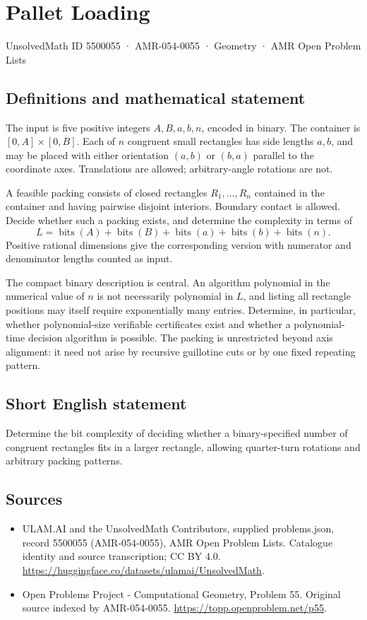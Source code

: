 \documentclass[11pt,a4paper]{article}
\begin{document}
\section*{Pallet Loading}\label{5500055}
{\small UnsolvedMath ID 5500055 · AMR-054-0055 · Geometry · AMR Open Problem Lists}
\subsection{Definitions and mathematical statement}
The input is five positive integers $A,B,a,b,n$, encoded in binary.
The container is $[0,A]\times[0,B]$. Each of $n$ congruent small
rectangles has side lengths $a,b$, and may be placed with either
orientation $(a,b)$ or $(b,a)$ parallel to the coordinate axes.
Translations are allowed; arbitrary-angle rotations are not.

A feasible packing consists of closed rectangles $R_1,\ldots,R_n$
contained in the container and having pairwise disjoint interiors.
Boundary contact is allowed. Decide whether such a packing exists,
and determine the complexity in terms of
\[
 L=\operatorname{bits}(A)+\operatorname{bits}(B)+
   \operatorname{bits}(a)+\operatorname{bits}(b)+\operatorname{bits}(n).
\]
Positive rational dimensions give the corresponding version with
numerator and denominator lengths counted as input.

The compact binary description is central. An algorithm polynomial
in the numerical value of $n$ is not necessarily polynomial in
$L$, and listing all rectangle positions may itself require
exponentially many entries. Determine, in particular, whether
polynomial-size verifiable certificates exist and whether a
polynomial-time decision algorithm is possible.
The packing is unrestricted beyond axis alignment: it need not
arise by recursive guillotine cuts or by one fixed repeating pattern.
\subsection{Short English statement}
Determine the bit complexity of deciding whether a binary-specified
number of congruent rectangles fits in a larger rectangle, allowing
quarter-turn rotations and arbitrary packing patterns.
\subsection{Sources}
\begin{itemize}
\item[S1] ULAM.AI and the UnsolvedMath Contributors, supplied problems.json, record 5500055 (AMR-054-0055), AMR Open Problem Lists. Catalogue identity and source transcription; CC BY 4.0.
\url{https://huggingface.co/datasets/ulamai/UnsolvedMath}.
\item[S2] Open Problems Project - Computational Geometry, Problem 55. Original source indexed by AMR-054-0055.
\url{https://topp.openproblem.net/p55}.
\end{itemize}
\end{document}

